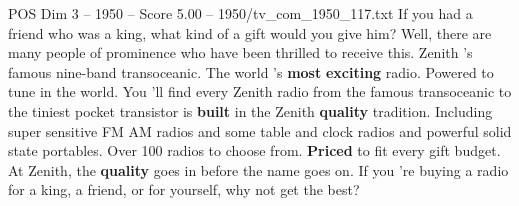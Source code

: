 \begin{textsample}{POS Dim 3 – 1950 – Score 5.00 – 1950/tv\_com\_1950\_117.txt}  \label{ex:f3_pos_009}
If you had a friend who was a king, what kind of a gift would you give him?
Well, there are many people of prominence who have been thrilled to receive this.
Zenith 's famous nine-band transoceanic.
The world 's \textbf{most} \textbf{exciting} radio.
Powered to tune in the world.
You 'll find every Zenith radio from the famous transoceanic to the tiniest pocket transistor is \textbf{built} in the Zenith \textbf{quality} tradition.
Including super sensitive FM AM radios and some table and clock radios and powerful solid state portables.
Over 100 radios to choose from. \textbf{Priced} to fit every gift budget.
At Zenith, the \textbf{quality} goes in before the name goes on.
If you 're buying a radio for a king, a friend, or for yourself, why not get the best?

\end{textsample}
